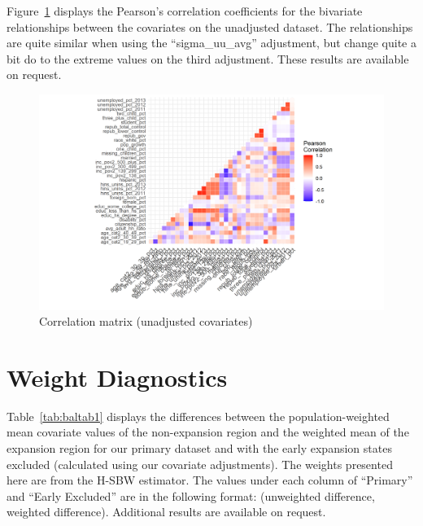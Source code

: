 \documentclass{article}
\begin{document}
\begin{appendix}
Figure~\ref{fig:corrmatrix} displays the Pearson's correlation coefficients for the bivariate relationships between the covariates on the unadjusted dataset. The relationships are quite similar when using the ``sigma\_uu\_avg'' adjustment, but change quite a bit do to the extreme values on the third adjustment. These results are available on request.

\begin{figure}[]
\begin{center}
    \caption{Correlation matrix (unadjusted covariates)}
    \label{fig:corrmatrix}
    \includegraphics[scale=0.6]{01_Plots/correlation-plot-c1-sigma-zero.png}
\end{center}
\end{figure}

\section{Weight Diagnostics}
\label{ssec:balancetables}

Table~\ref{tab:baltab1} displays the differences between the population-weighted mean covariate values of the non-expansion region and the weighted mean of the expansion region for our primary dataset and with the early expansion states excluded (calculated using our covariate adjustments). The weights presented here are from the H-SBW estimator. The values under each column of ``Primary'' and ``Early Excluded'' are in the following format: (unweighted difference, weighted difference). Additional results are available on request.


\end{appendix}
\end{document}
